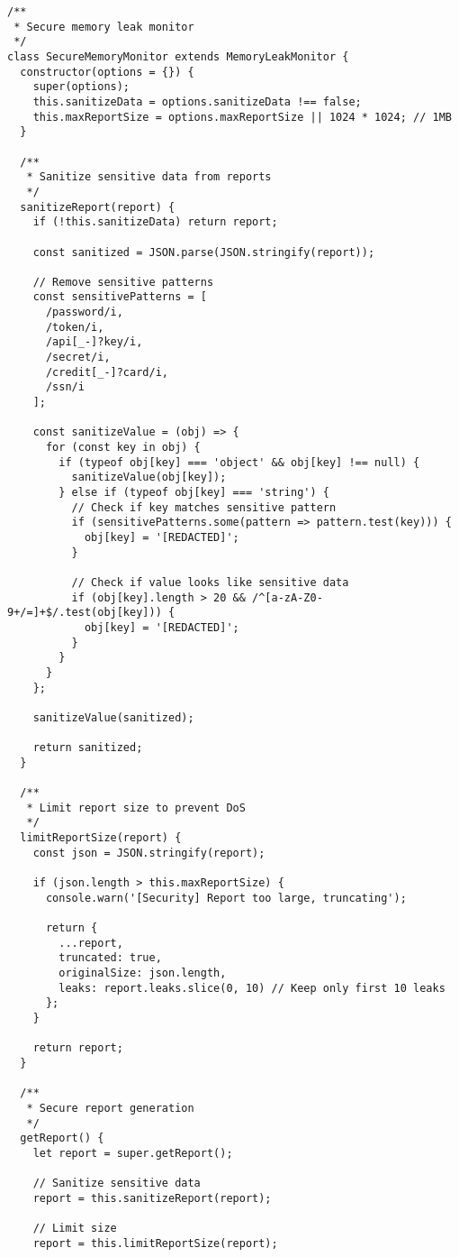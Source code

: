 \documentclass[11pt]{article}
\begin{document}
\begin{verbatim}
/**
 * Secure memory leak monitor
 */
class SecureMemoryMonitor extends MemoryLeakMonitor {
  constructor(options = {}) {
    super(options);
    this.sanitizeData = options.sanitizeData !== false;
    this.maxReportSize = options.maxReportSize || 1024 * 1024; // 1MB
  }
  
  /**
   * Sanitize sensitive data from reports
   */
  sanitizeReport(report) {
    if (!this.sanitizeData) return report;
    
    const sanitized = JSON.parse(JSON.stringify(report));
    
    // Remove sensitive patterns
    const sensitivePatterns = [
      /password/i,
      /token/i,
      /api[_-]?key/i,
      /secret/i,
      /credit[_-]?card/i,
      /ssn/i
    ];
    
    const sanitizeValue = (obj) => {
      for (const key in obj) {
        if (typeof obj[key] === 'object' && obj[key] !== null) {
          sanitizeValue(obj[key]);
        } else if (typeof obj[key] === 'string') {
          // Check if key matches sensitive pattern
          if (sensitivePatterns.some(pattern => pattern.test(key))) {
            obj[key] = '[REDACTED]';
          }
          
          // Check if value looks like sensitive data
          if (obj[key].length > 20 && /^[a-zA-Z0-9+/=]+$/.test(obj[key])) {
            obj[key] = '[REDACTED]';
          }
        }
      }
    };
    
    sanitizeValue(sanitized);
    
    return sanitized;
  }
  
  /**
   * Limit report size to prevent DoS
   */
  limitReportSize(report) {
    const json = JSON.stringify(report);
    
    if (json.length > this.maxReportSize) {
      console.warn('[Security] Report too large, truncating');
      
      return {
        ...report,
        truncated: true,
        originalSize: json.length,
        leaks: report.leaks.slice(0, 10) // Keep only first 10 leaks
      };
    }
    
    return report;
  }
  
  /**
   * Secure report generation
   */
  getReport() {
    let report = super.getReport();
    
    // Sanitize sensitive data
    report = this.sanitizeReport(report);
    
    // Limit size
    report = this.limitReportSize(report);
    

\end{verbatim}
\end{document}
